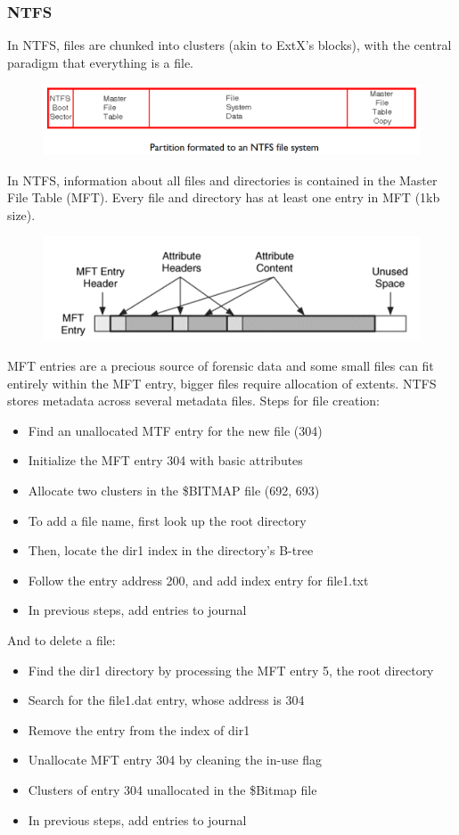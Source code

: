 \documentclass[10pt,a4paper]{report}
\begin{document}
\subsubsection{NTFS}
In NTFS, files are chunked into clusters (akin to ExtX's blocks), with the central paradigm that everything is a file.
\begin{figure}[H]
\centering
\includegraphics[scale=0.5]{34.png}
\end{figure}
In NTFS, information about all files and directories is contained in the Master File Table (MFT). Every file and directory has at least one entry in MFT (1kb size).
\begin{figure}[H]
\centering
\includegraphics[scale=0.5]{35.png}
\end{figure}
MFT entries are a precious source of forensic data and some small files can fit entirely within the MFT entry, bigger files require allocation of extents. NTFS stores metadata across several metadata files. Steps for file creation:
\begin{itemize}
\item Find an unallocated MTF entry for the new file (304)
\item Initialize the MFT entry 304 with basic attributes
\item Allocate two clusters in the \$BITMAP file (692, 693)
\item To add a file name, first look up the root directory
\item Then, locate the dir1 index in the directory’s B-tree
\item Follow the entry address 200, and add index entry for file1.txt
\item In previous steps, add entries to journal
\end{itemize}
And to delete a file:
\begin{itemize}
\item Find the dir1 directory by processing the MFT entry 5, the root directory
\item Search for the file1.dat entry, whose address is 304
\item Remove the entry from the index of dir1
\item Unallocate MFT entry 304 by cleaning the in-use flag
\item Clusters of entry 304 unallocated in the \$Bitmap file
\item In previous steps, add entries to journal
\end{itemize}
\end{document}
